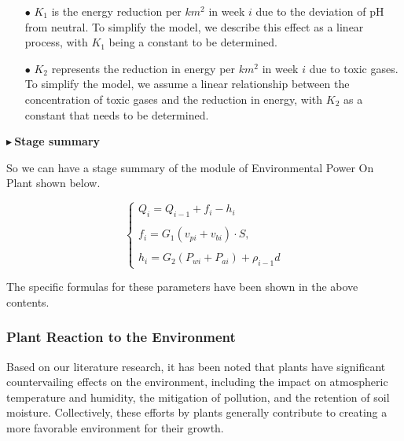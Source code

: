 \documentclass[12pt]{article}  %
\newenvironment{shrinkeq}[1]
{ \bgroup
	\addtolength\abovedisplayshortskip{#1}
	\addtolength\abovedisplayskip{#1}
	\addtolength\belowdisplayshortskip{#1}
	\addtolength\belowdisplayskip{#1}}
{\egroup\ignorespacesafterend}
\begin{document}
\begin{itemize}
\vspace{-0.2cm}
\item[$\bullet$] \textbf{$K_1$ }is the energy reduction per $km^2$ in week $i$ due to the deviation of pH from neutral. To simplify the model, we describe this effect as a linear process, with $K_1$ being a constant to be determined.
\item[$\bullet$]{$K_2$ }represents the reduction in energy per $km^2$ in week $i$ due to toxic gases. To simplify the model, we assume a linear relationship between the concentration of toxic gases and the reduction in energy, with $K_2$ as a constant that needs to be determined.
\end{itemize}

\vspace{-0.2cm}
\noindent$\blacktriangleright\ $\textbf{\small{Stage summary}}

So we can have a stage summary of the module of Environmental Power On Plant shown below. 

\begin{shrinkeq}{-1ex}
	\begin{equation}
    \label{eq:eq10}
    \left\{\begin{array}{l}
	Q_i=Q_{i-1}+f_i-h_i\\
    \\
    f_i=G_1(v_{pi}+v_{bi})\cdot S,\\
    \\
    h_i=G_2(P_{wi}+P_{ai})+\rho_{i-1}d
    \end{array}\right.
	\end{equation}
\end{shrinkeq}

The specific formulas for these parameters have been shown in the above contents.

\vspace{-0.5cm}
\subsubsection{Plant Reaction to the Environment}

\vspace{-0.4cm}
Based on our literature research, it has been noted that plants have significant countervailing effects on the environment, including the impact on atmospheric temperature and humidity, the mitigation of pollution, and the retention of soil moisture. Collectively, these efforts by plants generally contribute to creating a more favorable environment for their growth.
\end{document}

